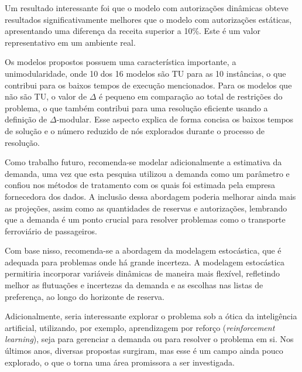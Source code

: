 Um resultado interessante foi que o modelo com autorizações dinâmicas obteve resultados significativamente melhores que o modelo com autorizações estáticas, apresentando uma diferença da receita superior a 10\%. Este é um valor representativo em um ambiente real.

Os modelos propostos possuem uma característica importante, a unimodularidade, onde 10 dos 16 modelos são TU para as 10 instâncias, o que contribui para os baixos tempos de execução mencionados. Para os modelos que não são TU, o valor de $\Delta$ é pequeno em comparação ao total de restrições do problema, o que também contribui para uma resolução eficiente usando a definição de $\Delta$-modular. Esse aspecto explica de forma concisa os baixos tempos de solução e o número reduzido de nós explorados durante o processo de resolução.



Como trabalho futuro, recomenda-se modelar adicionalmente a estimativa da demanda, uma vez que esta pesquisa utilizou a demanda como um parâmetro e confiou nos métodos de tratamento com os quais foi estimada pela empresa fornecedora dos dados. A inclusão dessa abordagem poderia melhorar ainda mais as projeções, assim como as quantidades de reservas e autorizações, lembrando que a demanda é um ponto crucial para resolver problemas como o transporte ferroviário de passageiros.

Com base nisso, recomenda-se a abordagem da modelagem estocástica, que é adequada para problemas onde há grande incerteza. A modelagem estocástica permitiria incorporar variáveis dinâmicas de maneira mais flexível, refletindo melhor as flutuações e incertezas da demanda e as escolhas nas listas de preferença, ao longo do horizonte de reserva.

Adicionalmente, seria interessante explorar o problema sob a ótica da inteligência artificial, utilizando, por exemplo, aprendizagem por reforço (\textit{reinforcement learning}), seja para gerenciar a demanda ou para resolver o problema em si. Nos últimos anos, diversas propostas surgiram, mas esse é um campo ainda pouco explorado, o que o torna uma área promissora a ser investigada.






